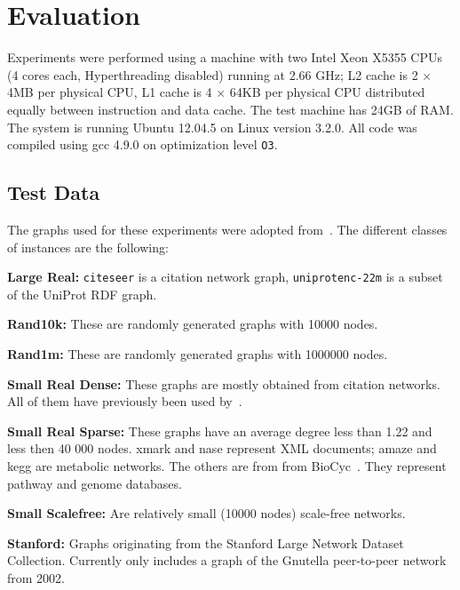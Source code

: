 \documentclass[12pt,a4paper,twoside]{article}
\begin{document}
\section{Evaluation}

Experiments were performed using a machine with two Intel Xeon X5355 CPUs (4 cores each, Hyperthreading disabled) running at 2.66 GHz; L2 cache is 2 $\times$ 4MB per physical CPU, L1 cache is 4 $\times$ 64KB per physical CPU distributed equally between instruction and data cache. The test machine has 24GB of RAM.
The system is running Ubuntu 12.04.5 on Linux version 3.2.0. All code was compiled using gcc 4.9.0 on optimization level \texttt{O3}.

\subsection{Test Data}

The graphs used for these experiments were adopted from~\cite{preach}. The different classes of instances are the following:
\begin{description}
  \item{\textbf{Large Real:}} \verb|citeseer| is a citation network graph, \verb|uniprotenc-22m| is a subset of the UniProt RDF graph.
  \item{\textbf{Rand10k:}} These are randomly generated graphs with 10000 nodes.
  \item{\textbf{Rand1m:}} These are randomly generated graphs with 1000000 nodes.
  \item{\textbf{Small Real Dense:}} These graphs are mostly obtained from citation networks. All of them have previously been used by~\cite{Jin:2009:HIS:1559845.1559930}.
  \item{\textbf{Small Real Sparse:}} These graphs have an average degree less than 1.22 and less then
    40 000 nodes. xmark and nase represent XML documents; amaze and kegg are metabolic
    networks. The others are from from BioCyc~\cite{grail}. They represent pathway and genome
    databases.
  \item{\textbf{Small Scalefree:}} Are relatively small (10000 nodes) scale-free networks.
  \item{\textbf{Stanford:}} Graphs originating from the Stanford Large Network Dataset Collection. Currently only includes a graph of the Gnutella peer-to-peer network from 2002.
\end{description}
\end{document}
